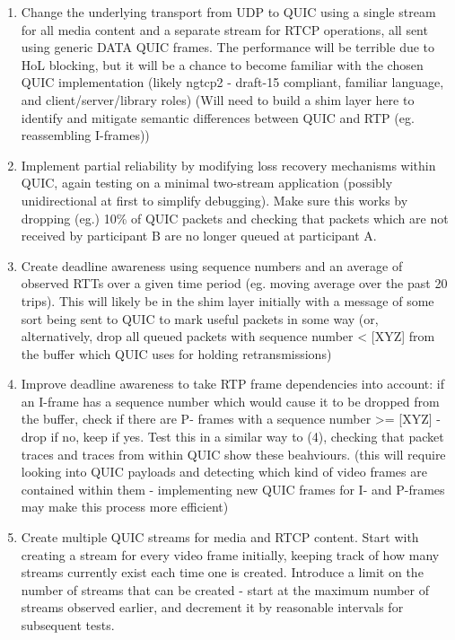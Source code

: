 \documentclass{mprop}
\begin{document}
\begin{enumerate}
  \item Change the underlying transport from UDP to QUIC using a single stream for all media 
  content and a separate stream for RTCP operations, all sent using generic DATA QUIC frames. The 
  performance will be terrible due to HoL blocking, but it will be a chance to become familiar 
  with the chosen QUIC implementation (likely ngtcp2 - draft-15 compliant, familiar language, and 
  client/server/library roles) (Will need to build a shim layer here to identify and mitigate 
  semantic differences between QUIC and RTP (eg. reassembling I-frames))

  \item Implement partial reliability by modifying loss recovery mechanisms within QUIC, again 
  testing on a minimal two-stream application (possibly unidirectional at first to simplify 
  debugging). Make sure this works by dropping (eg.) 10\% of QUIC packets and checking that 
  packets which are not received by participant B are no longer queued at participant A.

  \item Create deadline awareness using sequence numbers and an average of observed RTTs over a 
  given time period (eg. moving average over the past 20 trips). This will likely be in the shim 
  layer initially with a message of some sort being sent to QUIC to mark useful packets in some 
  way (or, alternatively, drop all queued packets with sequence number < [XYZ] from the buffer 
  which QUIC uses for holding retransmissions)

  \item Improve deadline awareness to take RTP frame dependencies into account: if an I-frame has 
  a sequence number which would cause it to be dropped from the buffer, check if there are P-
  frames with a sequence number >= [XYZ] - drop if no, keep if yes. Test this in a similar way to 
  (4), checking that packet traces and traces from within QUIC show these beahviours. (this will 
  require looking into QUIC payloads and detecting which kind of video frames are contained 
  within them - implementing new QUIC frames for I- and P-frames may make this process more 
  efficient)

  \item Create multiple QUIC streams for media and RTCP content. Start with creating a stream for 
  every video frame initially, keeping track of how many streams currently exist each time one is 
  created. Introduce a limit on the number of streams that can be created - start at the maximum 
  number of streams observed earlier, and decrement it by reasonable intervals for subsequent 
  tests.
\end{enumerate}
\end{document}
